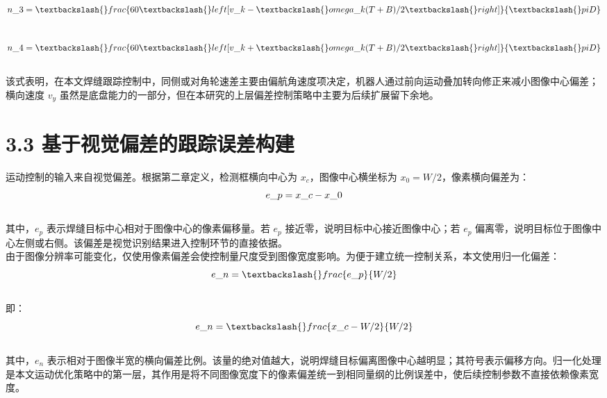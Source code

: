\documentclass[UTF8,a4paper,12pt]{ctexrep}
\begin{document}
$$\\
n\_3=\textbackslash\{\}frac\{60\textbackslash\{\}left[v\_k-\textbackslash\{\}omega\_k(T+B)/2\textbackslash\{\}right]\}\{\textbackslash\{\}pi D\}\\
$$\\

$$\\
n\_4=\textbackslash\{\}frac\{60\textbackslash\{\}left[v\_k+\textbackslash\{\}omega\_k(T+B)/2\textbackslash\{\}right]\}\{\textbackslash\{\}pi D\}\\
$$\\

该式表明，在本文焊缝跟踪控制中，同侧或对角轮速差主要由偏航角速度项决定，机器人通过前向运动叠加转向修正来减小图像中心偏差；横向速度 $v_y$ 虽然是底盘能力的一部分，但在本研究的上层偏差控制策略中主要为后续扩展留下余地。\\

\section{3.3 基于视觉偏差的跟踪误差构建}

运动控制的输入来自视觉偏差。根据第二章定义，检测框横向中心为 $x_c$，图像中心横坐标为 $x_0=W/2$，像素横向偏差为：\\

$$\\
e\_p = x\_c - x\_0\\
$$\\

其中，$e_p$ 表示焊缝目标中心相对于图像中心的像素偏移量。若 $e_p$ 接近零，说明目标中心接近图像中心；若 $e_p$ 偏离零，说明目标位于图像中心左侧或右侧。该偏差是视觉识别结果进入控制环节的直接依据。\\

由于图像分辨率可能变化，仅使用像素偏差会使控制量尺度受到图像宽度影响。为便于建立统一控制关系，本文使用归一化偏差：\\

$$\\
e\_n = \textbackslash\{\}frac\{e\_p\}\{W/2\}\\
$$\\

即：\\

$$\\
e\_n = \textbackslash\{\}frac\{x\_c-W/2\}\{W/2\}\\
$$\\

其中，$e_n$ 表示相对于图像半宽的横向偏差比例。该量的绝对值越大，说明焊缝目标偏离图像中心越明显；其符号表示偏移方向。归一化处理是本文运动优化策略中的第一层，其作用是将不同图像宽度下的像素偏差统一到相同量纲的比例误差中，使后续控制参数不直接依赖像素宽度。\\
\end{document}
